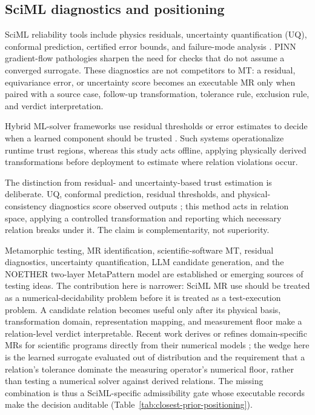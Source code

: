 \documentclass[preprint,12pt,authoryear]{elsarticle}
\begin{document}
\subsection{SciML diagnostics and positioning}
\label{subsec:sciml-vv}
\label{subsec:hybrid-trust}
\label{subsec:new-not-new}

SciML reliability tools include physics residuals, uncertainty quantification (UQ), conformal prediction, certified error bounds, and failure-mode analysis \citep{raissi2019pinn,karniadakis2021piml,li2021fno,krishnapriyan2021failure,gopakumar2025calibrated}. PINN gradient-flow pathologies \citep{wang2021gradflow,krishnapriyan2021failure} sharpen the need for checks that do not assume a converged surrogate. These diagnostics are not competitors to MT: a residual, equivariance error, or uncertainty score becomes an executable MR only when paired with a source case, follow-up transformation, tolerance rule, exclusion rule, and verdict interpretation.

Hybrid ML-solver frameworks use residual thresholds or error estimates to decide when a learned component should be trusted \citep{baral2025xrepit,wang2025deeponetfe}. Such systems operationalize runtime trust regions, whereas this study acts offline, applying physically derived transformations before deployment to estimate where relation violations occur.

The distinction from residual- and uncertainty-based trust estimation is deliberate. UQ, conformal prediction, residual thresholds, and physical-consistency diagnostics score observed outputs \citep{najafi2026}; this method acts in relation space, applying a controlled transformation and reporting which necessary relation breaks under it. The claim is complementarity, not superiority.

Metamorphic testing, MR identification, scientific-software MT, residual diagnostics, uncertainty quantification, LLM candidate generation, and the NOETHER two-layer MetaPattern model are established or emerging sources of testing ideas. The contribution here is narrower: SciML MR use should be treated as a numerical-decidability problem before it is treated as a test-execution problem. A candidate relation becomes useful only after its physical basis, transformation domain, representation mapping, and measurement floor make a relation-level verdict interpretable. Recent work derives or refines domain-specific MRs for scientific programs directly from their numerical models \citep{yan2024elliptic,stevens2025mars}; the wedge here is the learned surrogate evaluated out of distribution and the requirement that a relation's tolerance dominate the measuring operator's numerical floor, rather than testing a numerical solver against derived relations. The missing combination is thus a SciML-specific admissibility gate whose executable records make the decision auditable (Table~\ref{tab:closest-prior-positioning}).
\end{document}
